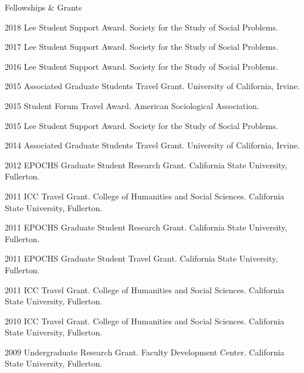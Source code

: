\begin{rSection}{Fellowships \& Grants}
\begin{hangt}{2018 \datefill}
Lee Student Support Award. Society for the Study of Social Problems. %
\end{hangt}
\begin{hangt}{2017 \datefill}
Lee Student Support Award. Society for the Study of Social Problems. %
\end{hangt}
\begin{hangt}{2016 \datefill}
Lee Student Support Award. Society for the Study of Social Problems. %
\end{hangt}
\begin{hangt}{2015 \datefill}
Associated Graduate Students Travel Grant. University of California, Irvine. %
\end{hangt}
\begin{hangt}{2015 \datefill}
Student Forum Travel Award. American Sociological Association. %
\end{hangt}
\begin{hangt}{2015 \datefill}
Lee Student Support Award. Society for the Study of Social Problems. %
\end{hangt}
\begin{hangt}{2014 \datefill}
Associated Graduate Students Travel Grant. University of California, Irvine. %
\end{hangt}
\begin{hangt}{2012 \datefill}
EPOCHS Graduate Student Research Grant. California State University, Fullerton. %
\end{hangt}
\begin{hangt}{2011 \datefill}
ICC Travel Grant. College of Humanities and Social Sciences. California State University, Fullerton. %
\end{hangt}
\begin{hangt}{2011 \datefill}
EPOCHS Graduate Student Research Grant. California State University, Fullerton. %
\end{hangt}
\begin{hangt}{2011 \datefill}
EPOCHS Graduate Student Travel Grant. California State University, Fullerton. %
\end{hangt}
\begin{hangt}{2011 \datefill}
ICC Travel Grant. College of Humanities and Social Sciences. California State University, Fullerton. %
\end{hangt}
\begin{hangt}{2010 \datefill}
ICC Travel Grant. College of Humanities and Social Sciences. California State University, Fullerton. %
\end{hangt}
\begin{hangt}{2009 \datefill}
Undergraduate Research Grant. Faculty Development Center. California State University, Fullerton. %
\end{hangt}

\end{rSection}


